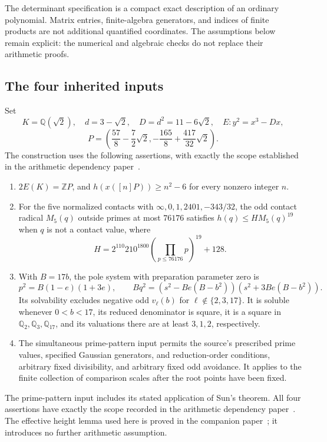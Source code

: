 \documentclass[11pt,a4paper]{article}
\newcommand{\Q}{\mathbb Q}\newcommand{\Z}{\mathbb Z}
\begin{document}
The determinant specification is a compact exact description of an
ordinary polynomial. Matrix entries, finite-algebra generators, and
indices of finite products are not additional quantified coordinates.
The assumptions below remain explicit: the numerical and algebraic
checks do not replace their arithmetic proofs.

\subsection{The four inherited inputs}\label{sec:inputs}

Set
\[
 K=\Q(\sqrt2),\quad d=3-\sqrt2,\quad D=d^2=11-6\sqrt2,
 \quad E:y^2=x^3-Dx,
\]
\[
 P=\left(\frac{57}{8}-\frac72\sqrt2,
          -\frac{165}{8}+\frac{417}{32}\sqrt2\right).
\]
The construction uses the following assertions, with exactly the
scope established in the arithmetic dependency paper~\cite{Dependencies}.
\begin{enumerate}
\item $2E(K)=\Z P$, and $h(x([n]P))\ge n^2-6$ for every
      nonzero integer $n$.
\item For the five normalized contacts with
      $\infty,0,1,2401,-343/32$, the odd contact radical
      $M_5(q)$ outside primes at most $76176$ satisfies
      $h(q)\le H M_5(q)^{19}$ when $q$ is not a contact value,
      where
\[
 H=2^{110}210^{1800}\left(\prod_{p\le76176}p\right)^{19}+128.
\]
\item With $B=17b$, the pole system with preparation parameter
      zero is
\[
 p^2=B(1-e)(1+3e),\qquad
 Bq^2=(s^2-Be(B-b^2))(s^2+3Be(B-b^2)).
\]
      Its solvability excludes negative odd $v_\ell(b)$ for
      $\ell\notin\{2,3,17\}$. It is soluble whenever
      $0<b<17$, its reduced denominator is square, it is a
      square in $\Q_2,\Q_3,\Q_{17}$, and its valuations there
      are at least $3,1,2$, respectively.
\item The simultaneous prime-pattern input permits the source's
      prescribed prime values, specified Gaussian generators, and reduction-order
      conditions, arbitrary fixed divisibility, and arbitrary
      fixed odd avoidance. It applies to the finite collection
      of comparison scales after the root points have been fixed.
\end{enumerate}
The prime-pattern input includes its stated application of Sun's
theorem. All four assertions have exactly the scope recorded in the
arithmetic dependency paper~\cite{Dependencies}. The effective
height lemma used here is proved in the companion paper~\cite{Effective};
it introduces no further arithmetic assumption.
\end{document}

